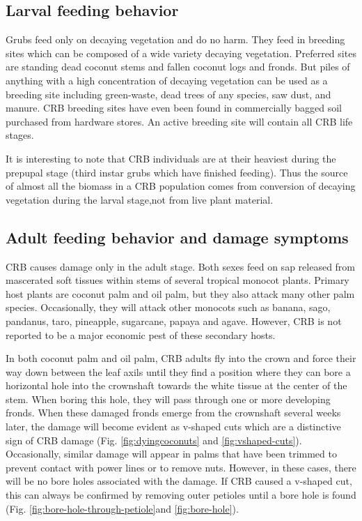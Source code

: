 \documentclass[twocolumn,letterpaper]{scrartcl}
\begin{document}
\subsection{Larval feeding behavior}

Grubs feed only on decaying vegetation and do no harm. They feed in breeding sites which can be composed of a wide variety decaying vegetation. Preferred sites are standing dead coconut stems and fallen coconut logs and fronds. But piles of anything with a high concentration of decaying vegetation can be used as a breeding site including green-waste, dead trees of any species, saw dust, and manure. CRB breeding sites have even been found in commercially bagged soil purchased from  hardware stores. An active breeding site will contain all CRB life stages.

It is interesting to note that CRB individuals are at their heaviest during the prepupal stage (third instar grubs which have finished feeding). Thus the source of almost all the biomass in a CRB population comes from conversion of decaying vegetation during the larval stage,not from live plant material.

\subsection{Adult feeding behavior and damage symptoms}

CRB causes damage only in the adult stage. Both sexes feed on sap released from mascerated soft tissues within stems of several tropical monocot plants. Primary host plants are coconut palm and oil palm, but they also attack many other palm species.  Occasionally, they will attack other monocots such as banana, sago, pandanus, taro, pineapple, sugarcane, papaya and agave. However, CRB is not reported to be a major economic pest of these secondary hosts.

In both coconut palm and oil palm, CRB adults fly into the crown and force their way down between the leaf axils until they find a position where they can bore a horizontal hole into the crownshaft towards the white tissue at the center of the stem. When boring this hole, they will pass through one or more developing fronds. When these damaged fronds emerge from the crownshaft several weeks later, the damage will become evident as v-shaped cuts which are a distinctive sign of CRB damage (Fig. \ref{fig:dyingcoconuts} and \ref{fig:vshaped-cuts}). Occasionally, similar damage will appear in palms that have been trimmed to prevent contact with power lines or to remove nuts. However, in these cases, there will be no bore holes associated with the damage. If CRB caused a v-shaped cut, this can always be confirmed by removing outer petioles until a bore hole is found (Fig. \ref{fig:bore-hole-through-petiole}and \ref{fig:bore-hole}).
\end{document}
